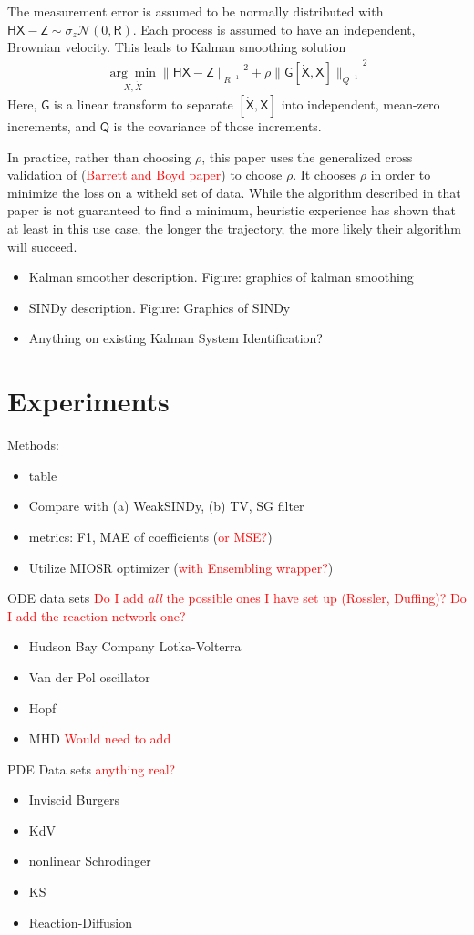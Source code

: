 \documentclass{article}
\newcommand{\red}[1]{\textcolor{red}{#1}}
\newcommand{\mat}[1]{\boldsymbol{\mathsf{#1}}}
\begin{document}
The measurement error is assumed to be normally distributed with $\mat H \mat X - \mat Z \sim \sigma_z \mathcal N(0, \mat R)$.  Each process is assumed to have an independent, Brownian velocity.  This leads to Kalman smoothing solution 
\begin{align}
    \underset{X, \dot X}{\arg\min}{\|\mat H \mat X - \mat Z\|_{R^{-1}}}^2 + \rho {\|\mat G [\mat {\dot X}, \mat X]\|_{Q^{-1}}}^2
\end{align}
Here, $\mat G$ is a linear transform to separate $[\mat{\dot X}, \mat X]$ into independent, mean-zero increments, and $\mat Q$ is the covariance of those increments.

In practice, rather than choosing $\rho$, this paper uses the generalized cross validation of (\red{Barrett and Boyd paper}) to choose $\rho$.  It chooses $\rho$ in order to minimize the loss on a witheld set of data.  While the algorithm described in that paper is not guaranteed to find a minimum, heuristic experience has shown that at least in this use case, the longer the trajectory, the more likely their algorithm will succeed.

\begin{itemize}
    \item Kalman smoother description.  Figure: graphics of kalman smoothing
    \item SINDy description.  Figure: Graphics of SINDy
    \item Anything on existing Kalman System Identification?
\end{itemize}

\section{Experiments}
Methods:
\begin{itemize}
    \item table
    \item Compare with (a) WeakSINDy, (b) TV, SG filter
    \item metrics: F1, MAE of coefficients (\textcolor{red}{or MSE?})
    \item Utilize MIOSR optimizer (\textcolor{red}{with Ensembling wrapper?})
\end{itemize}
ODE data sets \textcolor{red}{Do I add {\it all} the possible ones I have set up (Rossler, Duffing)?  Do I add the reaction network one?}
\begin{itemize}
    \item Hudson Bay Company Lotka-Volterra
    \item Van der Pol oscillator
    \item Hopf
    \item MHD \textcolor{red}{Would need to add}
\end{itemize}
PDE Data sets \textcolor{red}{anything real?}
\begin{itemize}
    \item Inviscid Burgers
    \item KdV
    \item nonlinear Schrodinger
    \item KS
    \item Reaction-Diffusion
\end{itemize}
\end{document}
